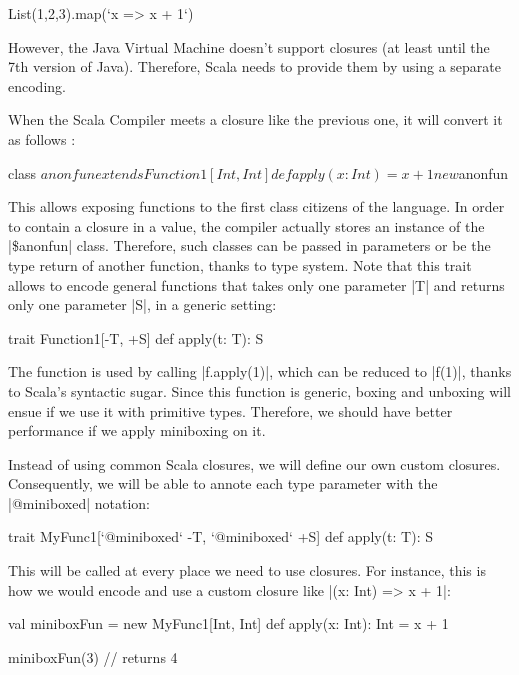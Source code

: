 \begin{lstlisting-nobreak}
 List(1,2,3).map(`x => x + 1`)
\end{lstlisting-nobreak}

However, the Java Virtual Machine doesn't support closures (at least until the 7th version of Java). Therefore, Scala needs to provide them by using a separate encoding.

When the Scala Compiler meets a closure like the previous one, it will convert it as follows :

\begin{lstlisting-nobreak}
 {
  class $anonfun extends Function1[Int, Int] {
    def apply(x: Int) = x + 1
  }

  new $anonfun
 }
\end{lstlisting-nobreak}

This allows exposing functions to the first class citizens of the language. In order to contain a closure in a value, the compiler actually stores an instance of the |\$anonfun| class. Therefore, such classes can be passed in parameters or be the type return of another function, thanks to type system. Note that this trait allows to encode general functions that takes only one parameter |T| and returns only one parameter |S|, in a generic setting:

\begin{lstlisting-nobreak}
 trait Function1[-T, +S] {
   def apply(t: T): S
 }
\end{lstlisting-nobreak}

The function is used by calling |f.apply(1)|, which can be reduced to |f(1)|, thanks to Scala's syntactic sugar. Since this function is generic, boxing and unboxing will ensue if we use it with primitive types. Therefore, we should have better performance if we apply miniboxing on it.

Instead of using common Scala closures, we will define our own custom closures. Consequently, we will be able to annote each type parameter with the |@miniboxed| notation:

\begin{lstlisting-nobreak}
 trait MyFunc1[`@miniboxed` -T, `@miniboxed` +S] {
   def apply(t: T): S
 }
\end{lstlisting-nobreak}

This will be called at every place we need to use closures. For instance, this is how we would encode and use a custom closure like |(x: Int) => x + 1|:

\begin{lstlisting-nobreak}
 val miniboxFun = new MyFunc1[Int, Int] {
   def apply(x: Int): Int = x + 1
 }

 miniboxFun(3)   // returns 4
\end{lstlisting-nobreak}

